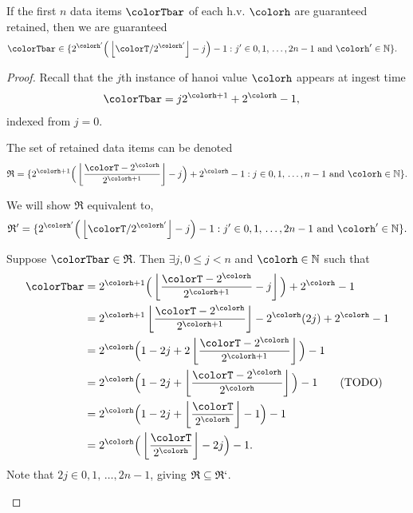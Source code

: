 \begin{lemma}
\label{thm:retained-equivalence-tilted}
If the first $n$ data items $\colorTbar$ of each h.v. $\colorh$ are guaranteed retained, then we are guaranteed
\begin{align*}
\colorTbar
&\in
\{
  2^{\colorh'}\Big(\left\lfloor \colorT / 2^{\colorh'} \right\rfloor - j\Big) - 1
  :
  j' \in 0,1,\,\ldots,2n-1
  \text{ and }
  \colorh' \in \mathbb{N}
\}.
\end{align*}
\end{lemma}
\begin{proof}

Recall that the $j$th instance of hanoi value $\colorh$ appears at ingest time
\begin{align*}
\colorTbar
&= j2^{\colorh + 1} + 2^{\colorh} - 1,
\end{align*}
indexed from $j=0$.

The set of retained data items can be denoted
\begin{align*}
\mathfrak{R} =
\{
  2^{\colorh + 1}\Big( \left\lfloor\frac{\colorT - 2^{\colorh}}{2^{\colorh + 1}} \right\rfloor - j\Big) + 2^{\colorh} - 1
  :
  j \in 0,1,\,\ldots,n-1
  \text{ and }
  \colorh \in \mathbb{N}
\}.
\end{align*}

We will show $\mathfrak{R}$ equivalent to,
\begin{align*}
\mathfrak{R}' =
\{
  2^{\colorh'}\Big(\left\lfloor \colorT / 2^{\colorh'} \right\rfloor - j\Big) - 1
  :
  j' \in 0,1,\,\ldots,2n-1
  \text{ and }
  \colorh' \in \mathbb{N}
\}.
\end{align*}

\begin{proofpart}
Suppose $\colorTbar \in \mathfrak{R}$.
Then $\exists j,  0 \leq j < n$ and $\colorh \in \mathbb{N}$ such that
\begin{align*}
\colorTbar
&= 2^{\colorh + 1}\Big(\left\lfloor \frac{\colorT - 2^{\colorh}}{2^{\colorh + 1}} - j\right\rfloor\Big) + 2^{\colorh} - 1\\
&= 2^{\colorh + 1}\left\lfloor \frac{\colorT - 2^{\colorh}}{2^{\colorh + 1}}\right\rfloor - 2^{\colorh}(2j) + 2^{\colorh} - 1\\
&= 2^{\colorh} \Big( 1 - 2j + 2\left\lfloor \frac{\colorT - 2^{\colorh}}{2^{\colorh + 1}} \right\rfloor \Big) - 1\\
&= 2^{\colorh} \Big( 1 - 2j + \left\lfloor \frac{\colorT - 2^{\colorh}}{2^{\colorh}} \right\rfloor \Big) - 1 \tag{TODO}\\
&= 2^{\colorh} \Big( 1 - 2j + \left\lfloor \frac{\colorT}{2^{\colorh}} \right\rfloor - 1 \Big) - 1\\
&= 2^{\colorh} \Big(\left\lfloor \frac{\colorT}{2^{\colorh}}\right\rfloor - 2j \Big) - 1.
\end{align*}
Note that $2j \in 0,1,\,\ldots,2n-1$, giving $\mathfrak{R} \subseteq \mathfrak{R}`$.
\end{proofpart}


\end{proof}
